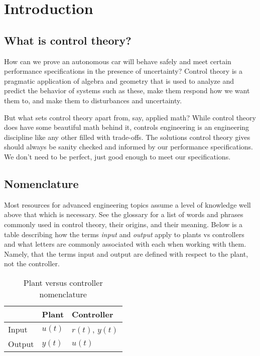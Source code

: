 
\chapter{Introduction}

\section{What is control theory?}

How can we prove an autonomous car will behave safely and meet certain
performance specifications in the presence of uncertainty? Control theory is a
pragmatic application of algebra and geometry that is used to analyze and
predict the behavior of \glspl{system} such as these, make them respond how we
want them to, and make them  to \glspl{disturbance}
and uncertainty.

But what sets control theory apart from, say, applied math? While control theory
does have some beautiful math behind it, controls engineering is an engineering
discipline like any other filled with trade-offs. The solutions control theory
gives should always be sanity checked and informed by our performance
specifications. We don't need to be perfect, just good enough to meet our
specifications.

\section{Nomenclature}

Most resources for advanced engineering topics assume a level of knowledge well
above that which is necessary. See the glossary for a list of words and phrases
commonly used in control theory, their origins, and their meaning. Below is a
table describing how the terms \textit{input} and \textit{output} apply to
\glspl{plant} vs \glspl{controller} and what letters are commonly associated
with each when working with them. Namely, that the terms input and output are
defined with respect to the \gls{plant}, not the \gls{controller}.

\begin{table}
  \renewcommand{\arraystretch}{1.3}
  \centering
  \begin{tabular}{|l|ll|}
    \hline
    \rowcolor{headingbg}
    & \textbf{Plant} & \textbf{Controller} \\
    \hline
    Input & $u(t)$ & $r(t)$, $y(t)$ \\
    Output & $y(t)$ & $u(t)$ \\
    \hline
  \end{tabular}
  \caption{Plant versus controller nomenclature}
  \label{tab:plant_v_controller}
\end{table}
